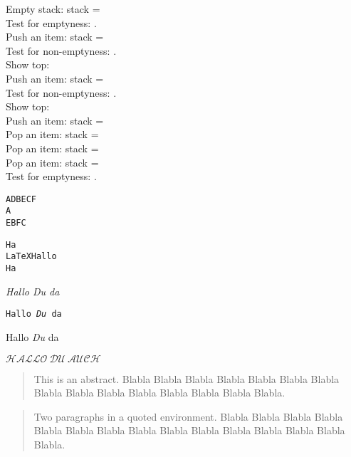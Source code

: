 \documentclass[12pt]{article}
\begin{document}
{\begin{lcHtmlBlock}
Empty stack: stack = \lciPrintStack{\mystack}\\
Test for emptyness: .\\
Push an item: stack = \lciPrintStack{\mystack}\\
Test for non-emptyness: .\\
Show top: \lciTopStack{\mystack}{\mytop}\mytop\\
Push an item: stack = \lciPrintStack{\mystack}\\
Test for non-emptyness: .\\
Show top: \lciTopStack{\mystack}{\mytop}\mytop\\
Push an item: stack = \lciPrintStack{\mystack}\\
\lciPopStack{\mystack}
Pop an item: stack = \lciPrintStack{\mystack}\\
\lciPopStack{\mystack}
Pop an item: stack = \lciPrintStack{\mystack}\\
\lciPopStack{\mystack}
Pop an item: stack = \lciPrintStack{\mystack}\\
Test for emptyness: .\\

\end{lcHtmlBlock}

\def\nn #1#2{A#1B#2C}

\begin{alltt}
\nn {D} {E} F
\nn {%} {
E} F

Ha
%
\LaTeX Hallo
%
Ha
\end{alltt}

{\it Hallo {\em Du} da}

{\tt Hallo {\em Du} da}

{\sc Hallo {\em Du} da}

$\mathcal{HALLO\ DU\ AUCH}$

\begin{abstract}
This is an abstract. Blabla Blabla Blabla Blabla
  Blabla Blabla Blabla Blabla Blabla Blabla Blabla Blabla Blabla
  Blabla Blabla.
\end{abstract}

\begin{quote}
  Two paragraphs in a quoted environment. Blabla Blabla Blabla Blabla
  Blabla Blabla Blabla Blabla Blabla Blabla Blabla Blabla Blabla
  Blabla Blabla.
  

\end{quote}}
\end{document}
